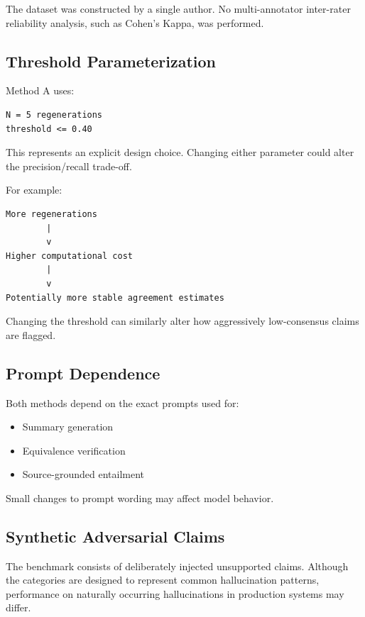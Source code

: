 \documentclass[11pt,a4paper]{article}
\begin{document}
The dataset was constructed by a single author. No multi-annotator inter-rater reliability analysis, such as Cohen's Kappa, was performed.

\subsection{Threshold Parameterization}

Method A uses:

\begin{lstlisting}
N = 5 regenerations
threshold <= 0.40
\end{lstlisting}

This represents an explicit design choice. Changing either parameter could alter the precision/recall trade-off.

For example:

\begin{lstlisting}
More regenerations
        |
        v
Higher computational cost
        |
        v
Potentially more stable agreement estimates
\end{lstlisting}

Changing the threshold can similarly alter how aggressively low-consensus claims are flagged.

\subsection{Prompt Dependence}

Both methods depend on the exact prompts used for:

\begin{itemize}
    \item Summary generation
    \item Equivalence verification
    \item Source-grounded entailment
\end{itemize}

Small changes to prompt wording may affect model behavior.

\subsection{Synthetic Adversarial Claims}

The benchmark consists of deliberately injected unsupported claims. Although the categories are designed to represent common hallucination patterns, performance on naturally occurring hallucinations in production systems may differ.
\end{document}
